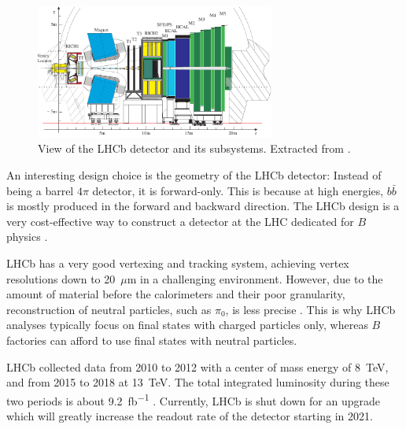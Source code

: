 \begin{figure}[ht]
    \centering
    \includegraphics[width=0.7\textwidth]{figs/lhcb_detector_view.pdf}
    \caption{
        View of the LHCb detector and its subsystems.
        Extracted from \cite{LHCb:2003ab}.
    }
    \label{fig:lhcb_detector_view}
\end{figure}

An interesting design choice is the geometry of the LHCb detector:
Instead of being a barrel $4\pi$ detector, it is forward-only.
This is because at high energies, $b\bar{b}$ is mostly produced in the forward
and backward direction.
The LHCb design is a very cost-effective way to construct a detector at the LHC
dedicated for $B$ physics \cite{LHCb:2008}.

LHCb has a very good vertexing and tracking system, achieving vertex resolutions
down to 20~$\mu$m in a challenging environment.
However, due to the amount of material before the calorimeters and their poor
granularity,
reconstruction of neutral particles, such as $\pi_0$, is less
precise \cite{LHCb:2008,Guz:2017}.
This is why LHCb analyses typically focus on final states with charged particles
only, whereas $B$ factories can afford to use final states with neutral particles.

LHCb collected data from 2010 to 2012 with a center of mass energy of
\SI{8}{TeV}, and from 2015 to 2018 at \SI{13}{TeV}.
The total integrated luminosity during these two periods is about
\SI{9.2}{fb^{-1}} \cite{LHCb-Lumi:2019}.
Currently, LHCb is shut down for an upgrade which will greatly increase the
readout rate of the detector starting in 2021.


